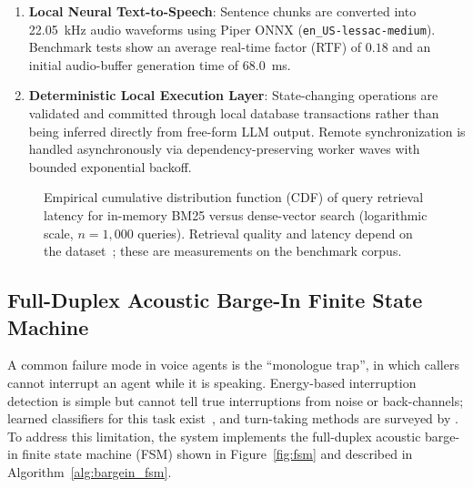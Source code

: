 \documentclass[review,12pt,times,authoryear]{elsarticle}
\theoremstyle{definition}
\begin{document}
\begin{enumerate}
  \item \textbf{Local Neural Text-to-Speech}: Sentence chunks are converted into \SI{22.05}{\kilo\hertz} audio waveforms using Piper ONNX (\texttt{en\_US-lessac-medium}). Benchmark tests show an average real-time factor (RTF) of $0.18$ and an initial audio-buffer generation time of \SI{68.0}{\milli\second}.
  \item \textbf{Deterministic Local Execution Layer}: State-changing operations are validated and committed through local database transactions rather than being inferred directly from free-form LLM output. Remote synchronization is handled asynchronously via dependency-preserving worker waves with bounded exponential backoff.
\end{enumerate}

\begin{figure}[t]
\centering
{}
\caption{Empirical cumulative distribution function (CDF) of query retrieval latency for in-memory BM25 versus dense-vector search (logarithmic scale, $n = 1{,}000$ queries). Retrieval quality and latency depend on the dataset~\citep{Thakur2021}; these are measurements on the benchmark corpus.}
\label{fig:rag_latency_cdf}
\end{figure}

\subsection{Full-Duplex Acoustic Barge-In Finite State Machine}
A common failure mode in voice agents is the ``monologue trap'', in which callers cannot interrupt an agent while it is speaking. Energy-based interruption detection is simple but cannot tell true interruptions from noise or back-channels; learned classifiers for this task exist~\citep{Bekal2022}, and turn-taking methods are surveyed by \citet{Castillo2025}. To address this limitation, the system implements the full-duplex acoustic barge-in finite state machine (FSM) shown in Figure~\ref{fig:fsm} and described in Algorithm~\ref{alg:bargein_fsm}.
\end{document}
